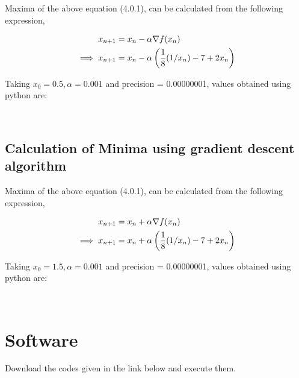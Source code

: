 \documentclass[journal,10pt,twocolumn]{article}
\begin{document}
\begin{flushleft}
Maxima of the above equation (4.0.1), can be calculated from the following expression,\\
\end{flushleft}
\vspace{0.25cm}
    \begin{align}
        x_{n+1} &= x_n - \alpha \nabla f(x_n) \\
        \vspace{0.35cm}
        \implies x_{n+1} &= x_n - \alpha \brak{\frac{1}{8}(1/x_n)-7+2x_n}
    \end{align}
\begin{flushleft}
Taking $x_0=0.5,\alpha=0.001$ and precision = 0.00000001, values obtained using python are:
\end{flushleft} 
\vspace{0.35cm}
\center
        \\
        \vspace{0.45cm}
\endcenter
\begin{flushleft}
\subsection{Calculation of Minima using gradient descent algorithm}
\end{flushleft}
\begin{flushleft}
Maxima of the above equation (4.0.1), can be calculated from the following expression,\\
\end{flushleft}
\vspace{0.25cm}
    \begin{align}
        x_{n+1} &= x_n + \alpha \nabla f(x_n) \\
        \vspace{0.35cm}
        \implies x_{n+1} &= x_n + \alpha \brak{\frac{1}{8}(1/x_n)-7+2x_n}
    \end{align}
\begin{flushleft}
Taking $x_0=1.5,\alpha=0.001$ and precision = 0.00000001, values obtained using python are:
\end{flushleft} 
\vspace{0.35cm}
\center
        \\
        \vspace{0.45cm}
\endcenter
\section{Software}
\begin{flushleft}
Download the codes given in the link below and execute them.\\
\end{flushleft}
\end{document}
